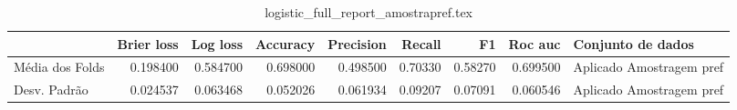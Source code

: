\begin{table}
\centering
\caption{logistic_full_report_amostrapref.tex}
\label{logistic_full_report_amostrapref.tex}
\begin{tabular}{lrrrrrrrl}
\toprule
{} &  Brier  loss &  Log loss &  Accuracy  &  Precision  &  Recall  &      F1  &  Roc auc  &         Conjunto de dados \\
\midrule
Média dos Folds &     0.198400 &  0.584700 &   0.698000 &    0.498500 &  0.70330 &  0.58270 &  0.699500 &  Aplicado Amostragem pref \\
Desv. Padrão    &     0.024537 &  0.063468 &   0.052026 &    0.061934 &  0.09207 &  0.07091 &  0.060546 &  Aplicado Amostragem pref \\
\bottomrule
\end{tabular}
\end{table}
